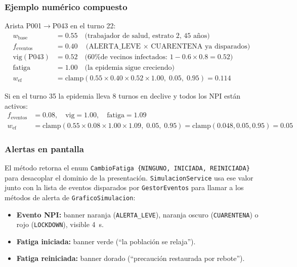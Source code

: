 \documentclass[spanish,notitlepage,letterpaper, 12pt]{article}
\begin{document}
\subsubsection{Ejemplo num\'erico compuesto}

Arista P001$\to$P043 en el turno 22:
\begin{align*}
w_{\text{base}} &= 0.55 \quad \text{(trabajador de salud, estrato 2, 45 a\~nos)} \\
f_{\text{eventos}} &= 0.40 \quad \text{(ALERTA\_LEVE $\times$ CUARENTENA ya disparados)} \\
\mathrm{vig}(\text{P043}) &= 0.52 \quad \text{(60\% de vecinos infectados: $1 - 0.6 \times 0.8 = 0.52$)} \\
\mathrm{fatiga} &= 1.00 \quad \text{(la epidemia sigue creciendo)} \\
w_{\text{ef}} &= \mathrm{clamp}(0.55 \times 0.40 \times 0.52 \times 1.00,\; 0.05,\; 0.95) = 0.114
\end{align*}

Si en el turno 35 la epidemia lleva 8 turnos en declive y todos los NPI est\'an activos:
\begin{align*}
f_{\text{eventos}} &= 0.08, \quad \mathrm{vig} = 1.00, \quad \mathrm{fatiga} = 1.09 \\
w_{\text{ef}} &= \mathrm{clamp}(0.55 \times 0.08 \times 1.00 \times 1.09,\; 0.05,\; 0.95) = \mathrm{clamp}(0.048, 0.05, 0.95) = 0.05
\end{align*}

\subsubsection{Alertas en pantalla}

El m\'etodo retorna el enum \texttt{CambioFatiga \{NINGUNO, INICIADA, REINICIADA\}} para desacoplar el dominio de la presentaci\'on. \texttt{SimulacionService} usa ese valor junto con la lista de eventos disparados por \texttt{GestorEventos} para llamar a los m\'etodos de alerta de \texttt{GraficoSimulacion}:

\begin{itemize}[leftmargin=*]
    \item \textbf{Evento NPI:} banner naranja (\texttt{ALERTA\_LEVE}), naranja oscuro (\texttt{CUARENTENA}) o rojo (\texttt{LOCKDOWN}), visible 4~s.
    \item \textbf{Fatiga iniciada:} banner verde (``la poblaci\'on se relaja'').
    \item \textbf{Fatiga reiniciada:} banner dorado (``precauci\'on restaurada por rebote'').
\end{itemize}
\end{document}
